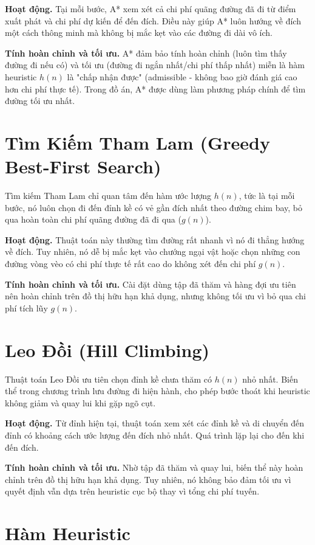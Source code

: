 \textbf{Hoạt động.} Tại mỗi bước, A* xem xét cả chi phí quãng đường đã đi từ điểm xuất phát và chi phí dự kiến để đến đích. Điều này giúp A* luôn hướng về đích một cách thông minh mà không bị mắc kẹt vào các đường đi dài vô ích.

\textbf{Tính hoàn chỉnh và tối ưu.} A* đảm bảo tính hoàn chỉnh (luôn tìm thấy đường đi nếu có) và tối ưu (đường đi ngắn nhất/chi phí thấp nhất) miễn là hàm heuristic $h(n)$ là "chấp nhận được" (admissible - không bao giờ đánh giá cao hơn chi phí thực tế). Trong đồ án, A* được dùng làm phương pháp chính để tìm đường tối ưu nhất.

\section{Tìm Kiếm Tham Lam (Greedy Best-First Search)}

Tìm kiếm Tham Lam chỉ quan tâm đến hàm ước lượng $h(n)$, tức là tại mỗi bước, nó luôn chọn đi đến đỉnh kề có vẻ gần đích nhất theo đường chim bay, bỏ qua hoàn toàn chi phí quãng đường đã đi qua ($g(n)$).

\textbf{Hoạt động.} Thuật toán này thường tìm đường rất nhanh vì nó đi thẳng hướng về đích. Tuy nhiên, nó dễ bị mắc kẹt vào chướng ngại vật hoặc chọn những con đường vòng vèo có chi phí thực tế rất cao do không xét đến chi phí $g(n)$.

\textbf{Tính hoàn chỉnh và tối ưu.} Cài đặt dùng tập đã thăm và hàng đợi ưu
tiên nên hoàn chỉnh trên đồ thị hữu hạn khả dụng, nhưng không tối ưu vì bỏ qua
chi phí tích lũy $g(n)$.

\section{Leo Đồi (Hill Climbing)}

Thuật toán Leo Đồi ưu tiên chọn đỉnh kề chưa thăm có $h(n)$ nhỏ nhất. Biến thể
trong chương trình lưu đường đi hiện hành, cho phép bước thoát khi heuristic
không giảm và quay lui khi gặp ngõ cụt.

\textbf{Hoạt động.} Từ đỉnh hiện tại, thuật toán xem xét các đỉnh kề và di chuyển đến đỉnh có khoảng cách ước lượng đến đích nhỏ nhất. Quá trình lặp lại cho đến khi đến đích.

\textbf{Tính hoàn chỉnh và tối ưu.} Nhờ tập đã thăm và quay lui, biến thể này
hoàn chỉnh trên đồ thị hữu hạn khả dụng. Tuy nhiên, nó không bảo đảm tối ưu vì
quyết định vẫn dựa trên heuristic cục bộ thay vì tổng chi phí tuyến.

\section{Hàm Heuristic}

